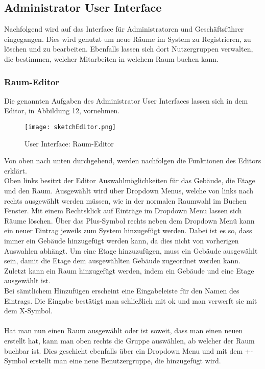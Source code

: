\subsection{Administrator User Interface}

Nachfolgend wird auf das Interface für Administratoren und Geschäftsführer eingegangen. 
Dies wird genutzt um neue Räume im System zu Registrieren, zu löschen und zu bearbeiten.
Ebenfalls lassen sich dort Nutzergruppen verwalten, die bestimmen, welcher Mitarbeiten in welchem Raum buchen kann. 

\newpage
\subsubsection{Raum-Editor}
Die genannten Aufgaben des Administrator User Interfaces lassen sich in dem Editor, in Abbildung 12, vornehmen.

\begin{figure}[!h]
  \centering
  \texttt{[image: sketchEditor.png]}
  \caption{User Interface: Raum-Editor}
  \label{fig:sketch_RaumEditor}
\end{figure}

Von oben nach unten durchgehend, werden nachfolgen die Funktionen des Editors erklärt.
\\
Oben links besitzt der Editor Auswahlmöglichkeiten für das Gebäude, die Etage und den Raum.
Ausgewählt wird über Dropdown Menus, welche von links nach rechts ausgewählt werden müssen, wie in der normalen Raumwahl im Buchen Fenster.
Mit einem Rechtsklick auf Einträge im Dropdown Menu lassen sich Räume löschen.
Über das Plus-Symbol rechts neben dem Dropdown Menü kann ein neuer Eintrag jeweils zum System hinzugefügt werden.
Dabei ist es so, dass immer ein Gebäude hinzugefügt werden kann, da dies nicht von vorherigen Auswahlen abhängt. 
Um eine Etage hinzuzufügen, muss ein Gebäude ausgewählt sein, damit die Etage dem ausgewählten Gebäude zugeordnet werden kann.
Zuletzt kann ein Raum hinzugefügt werden, indem ein Gebäude und eine Etage ausgewählt ist.
\\
Bei sämtlichem Hinzufügen erscheint eine Eingabeleiste für den Namen des Eintrags.
Die Eingabe bestätigt man schließlich mit ok und man verwerft sie mit dem X-Symbol.

\paragraph{} Hat man nun einen Raum ausgewählt oder ist soweit, dass man einen neuen erstellt hat, kann man oben rechts die Gruppe auswählen, ab welcher der Raum buchbar ist.
Dies geschieht ebenfalls über ein Dropdown Menu und mit dem +-Symbol erstellt man eine neue Benutzergruppe, die hinzugefügt wird. 

